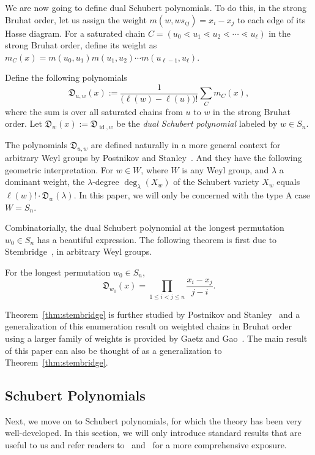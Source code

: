 \documentclass[10pt]{amsart}
\newcommand{\D}{\mathfrak{D}}
\DeclareMathOperator{\id}{id}
\begin{document}
We are now going to define dual Schubert polynomials. To do this, in the strong Bruhat order, let us assign the weight $m(w,ws_{ij})=x_i-x_j$ to each edge of its Hasse diagram. For a saturated chain $C=(u_0\lessdot u_1\lessdot u_2\lessdot\cdots\lessdot u_{\ell})$ in the strong Bruhat order, define its weight as $m_C(x)=m(u_0,u_1)m(u_1,u_2)\cdots m(u_{\ell-1},u_{\ell}).$ 
\begin{defi}
Define the following polynomials 
\[
\D_{u,w}(x):=\frac{1}{\big(\ell(w)-\ell(u)\big)!}\sum_{C}m_C(x),
\] 
where the sum is over all saturated chains from $u$ to $w$ in the strong Bruhat order. Let $\D_w(x):=\D_{\id,w}$ be the \emph{dual Schubert polynomial} labeled by $w\in S_n$. 
\end{defi}

The polynomials $\D_{u,w}$ are defined naturally in a more general context for arbitrary Weyl groups by Postnikov and Stanley~\cite{postnikov2009chains}. And they have the following geometric interpretation. For $w\in W$, where $W$ is any Weyl group, and $\lambda$ a dominant weight, the $\lambda$-degree $\deg_{\lambda}(X_w)$ of the Schubert variety $X_w$ equals $\ell(w)!\cdot\D_w(\lambda)$. In this paper, we will only be concerned with the type A case $W=S_n$. 

Combinatorially, the dual Schubert polynomial at the longest permutation $w_0\in S_n$ has a beautiful expression. The following theorem is first due to Stembridge~\cite{stembridge2002weighted}, in arbitrary Weyl groups.
\begin{theorem}\label{thm:stembridge}
For the longest permutation $w_0\in S_n$,
\[
\D_{w_0}(x)=\prod_{1\leq i<j\leq n}\frac{x_i-x_j}{j-i}.
\]
\end{theorem}
Theorem~\ref{thm:stembridge} is further studied by Postnikov and Stanley~\cite{postnikov2009chains} and a generalization of this enumeration result on weighted chains in Bruhat order using a larger family of weights is provided by Gaetz and Gao~\cite{gaetz2019padded,gaetz2018combinatorial}. The main result of this paper can also be thought of as a generalization to Theorem~\ref{thm:stembridge}.

\subsection{Schubert Polynomials}
Next, we move on to Schubert polynomials, for which the theory has been very well-developed. In this section, we will only introduce standard results that are useful to us and refer readers to~\cite{fomin1994schubert} and~\cite{manivel2001symmetric} for a more comprehensive exposure.
\end{document}

